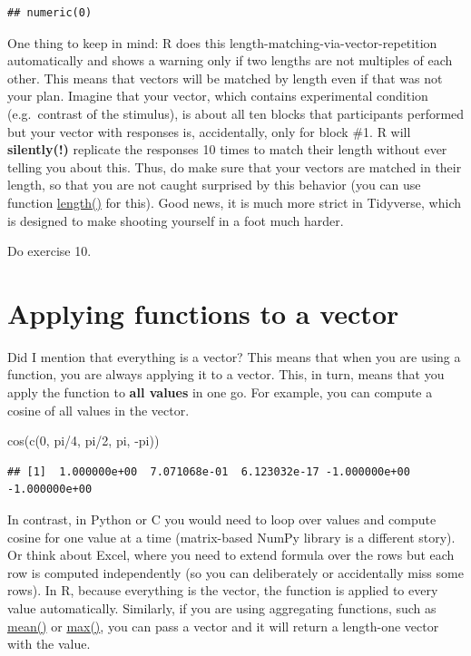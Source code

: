 \documentclass[
]{book}
\newenvironment{Shaded}{\begin{snugshade}}{\end{snugshade}}
\newcommand{\DecValTok}[1]{\textcolor[rgb]{0.00,0.00,0.81}{#1}}
\newcommand{\FunctionTok}[1]{\textcolor[rgb]{0.00,0.00,0.00}{#1}}
\newcommand{\NormalTok}[1]{#1}
\newcommand{\SpecialCharTok}[1]{\textcolor[rgb]{0.00,0.00,0.00}{#1}}
\begin{document}
\begin{verbatim}
## numeric(0)
\end{verbatim}

One thing to keep in mind: R does this length-matching-via-vector-repetition automatically and shows a warning only if two lengths are not multiples of each other. This means that vectors will be matched by length even if that was not your plan. Imagine that your vector, which contains experimental condition (e.g.~contrast of the stimulus), is about all ten blocks that participants performed but your vector with responses is, accidentally, only for block \#1. R will \textbf{silently(!)} replicate the responses 10 times to match their length without ever telling you about this. Thus, do make sure that your vectors are matched in their length, so that you are not caught surprised by this behavior (you can use function \href{https://stat.ethz.ch/R-manual/R-devel/library/base/html/length.html}{length()} for this). Good news, it is much more strict in Tidyverse, which is designed to make shooting yourself in a foot much harder.

Do exercise 10.

\hypertarget{applying-functions-to-a-vector}{%
\section{Applying functions to a vector}\label{applying-functions-to-a-vector}}

Did I mention that everything is a vector? This means that when you are using a function, you are always applying it to a vector. This, in turn, means that you apply the function to \textbf{all values} in one go. For example, you can compute a cosine of all values in the vector.

\begin{Shaded}
\begin{Highlighting}[]
\FunctionTok{cos}\NormalTok{(}\FunctionTok{c}\NormalTok{(}\DecValTok{0}\NormalTok{, pi}\SpecialCharTok{/}\DecValTok{4}\NormalTok{, pi}\SpecialCharTok{/}\DecValTok{2}\NormalTok{, pi, }\SpecialCharTok{{-}}\NormalTok{pi))}
\end{Highlighting}
\end{Shaded}

\begin{verbatim}
## [1]  1.000000e+00  7.071068e-01  6.123032e-17 -1.000000e+00 -1.000000e+00
\end{verbatim}

In contrast, in Python or C you would need to loop over values and compute cosine for one value at a time (matrix-based NumPy library is a different story). Or think about Excel, where you need to extend formula over the rows but each row is computed independently (so you can deliberately or accidentally miss some rows). In R, because everything is the vector, the function is applied to every value automatically. Similarly, if you are using aggregating functions, such as \href{https://stat.ethz.ch/R-manual/R-devel/library/base/html/mean.html}{mean()} or \href{https://stat.ethz.ch/R-manual/R-devel/library/base/html/Extremes.html}{max()}, you can pass a vector and it will return a length-one vector with the value.
\end{document}
